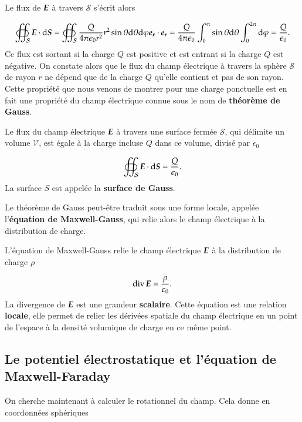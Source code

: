 Le flux de $\vece$ à travers $\mathcal{S}$ s'écrit alors

\begin{equation}
	\oiint_\mathcal{S} \vece \cdot \ds = \oiint_\mathcal{S} \dfrac{Q}{4\pi\epsilon_0 r^2}
	                       r^2 \sin \theta \dtheta \dphi \er \cdot \er
			     = \dfrac{Q}{4 \pi \epsilon_0} \int_0^\pi \sin \theta \dtheta
			     \int_0^{2\pi} \dphi
			     = \dfrac{Q}{\epsilon_0}.
\end{equation}
Ce flux est sortant si la charge $Q$ est positive et est entrant si la charge
$Q$ est négative.
On constate alors que le flux du champ électrique à travers la sphère $\mathcal{S}$
de rayon $r$ ne dépend que de la charge $Q$ qu'elle contient et pas de son rayon.
Cette propriété que nous venons de montrer pour une charge ponctuelle est en 
fait une propriété du champ électrique connue sous le nom de \textbf{théorème de 
Gauss}.

\begin{defn}
	Le flux du champ électrique $\vece$ à travers une surface fermée $\mathcal{S}$, 
	qui délimite un volume $\mathcal{V}$, est égale à la charge incluse $Q$ dans
	ce volume, divisé par $\epsilon_0$

	\begin{equation}
		\oiint_\mathcal{S} \vece \cdot \ds = \dfrac{Q}{\epsilon_0}.
		\label{eq:gauss}
	\end{equation}
	La surface $S$ est appelée la \textbf{surface de Gauss}.
\end{defn}

Le théorème de Gauss peut-être traduit sous une forme locale, 
appelée l'\textbf{équation de 
Maxwell-Gauss}, qui relie alors le champ électrique à la distribution de charge.

\begin{defn}
	L'équation de Maxwell-Gauss relie le champ électrique $\vece$ à la 
	distribution de charge $\rho$

	\begin{equation}
		\div \vece = \dfrac{\rho}{\epsilon_0}.
		\label{eq:MG}
	\end{equation}
	La divergence de $\vece$ est une grandeur \textbf{scalaire}. 
	Cette équation est une relation \textbf{locale}, elle permet de relier
	les dérivées spatiale du champ électrique en un point de l'espace à 
	la densité volumique de charge en ce même point.
\end{defn}

\subsection{Le potentiel électrostatique et l'équation de Maxwell-Faraday}
On cherche maintenant à calculer le rotationnel du champ. 
Cela donne en 
coordonnées sphériques

